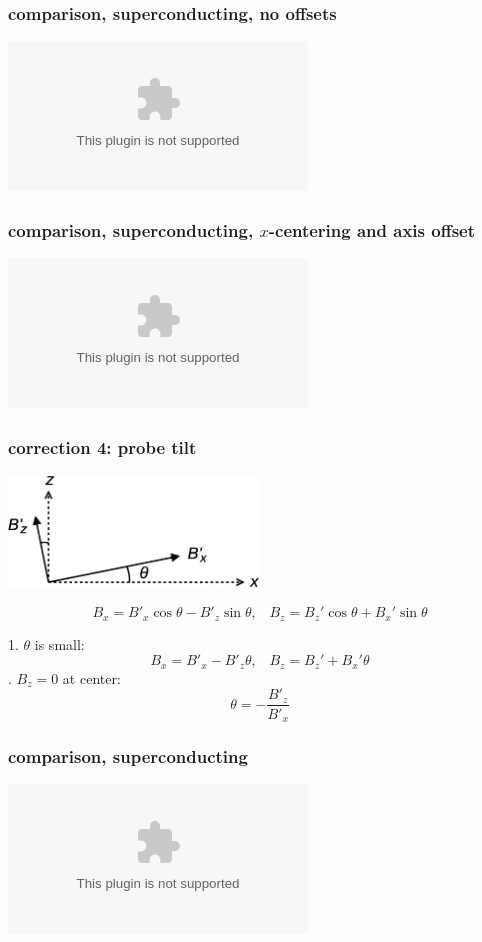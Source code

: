 \documentclass{beamer}
\newcommand{\pyplot}{\includegraphics[width=\textwidth, trim=60px 60px 60px 40px]}
\begin{document}
\begin{frame}
\begin{columns}
    \end{columns}

\end{frame}

\begin{frame}
\frametitle{comparison, superconducting, no offsets}

    \begin{center}
    \pyplot{../savedplots/endcapThreeNoOffset.eps}
    \end{center}

\end{frame}

\begin{frame}
\frametitle{comparison, superconducting, $x$-centering and axis offset}

    \begin{center}
    \pyplot{../savedplots/endcapThreeOffset.eps}
    \end{center}

\end{frame}

\begin{frame}
\frametitle{correction 4: probe tilt}
    
    \begin{center}
        \includegraphics[width=0.5\textwidth]{figures/probe_tilt.eps}
    \end{center} \pause
    \begin{equation}
        B_x = B'_x \cos\theta - B'_z \sin\theta, \;\;\; B_z = B_z' \cos\theta + B_x' \sin\theta
    \end{equation}

    \pause

    \bigskip

    1. $\theta$ is small: \pause
    \begin{equation*}
        B_x = B'_x - B'_z \theta, \;\;\; B_z = B_z' + B_x' \theta
    \end{equation*} . $B_z = 0$ at center: \pause
    \begin{equation*}
        \theta = -\frac{B'_z}{B'_x}
    \end{equation*}

\end{frame}

\begin{frame}
\frametitle{comparison, superconducting}

    \begin{center}
    \pyplot{../savedplots/w5_comp.eps}
    \end{center}

\end{frame}
\end{document}
